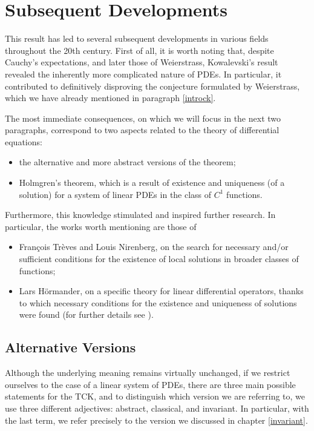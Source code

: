 \chapter{Subsequent Developments}

This result has led to several subsequent developments in various fields throughout the 20th century. First of all, it is worth noting that, despite Cauchy's expectations, and later those of Weierstrass, Kowalevski's result revealed the inherently more complicated nature of PDEs. In particular, it contributed to definitively disproving the conjecture formulated by Weierstrass, which we have already mentioned in paragraph \ref{introck}.

The most immediate consequences, on which we will focus in the next two paragraphs, correspond to two aspects related to the theory of differential equations:
\begin{itemize}
\item the alternative and more abstract versions of the theorem;
\item Holmgren's theorem, which is a result of existence and uniqueness (of a solution) for a system of linear PDEs in the class of $C^1$ functions.
\end{itemize}

Furthermore, this knowledge stimulated and inspired further research. In particular, the works worth mentioning are those of
\begin{itemize}
\item François Trèves and Louis Nirenberg, on the search for necessary and/or sufficient conditions for the existence of local solutions in broader classes of functions;
\item Lars Hörmander, on a specific theory for linear differential operators, thanks to which necessary conditions for the existence and uniqueness of solutions were found (for further details see \cite{Hormander}).
\end{itemize}

\newpage
\section{Alternative Versions}

Although the underlying meaning remains virtually unchanged, if we restrict ourselves to the case of a linear system of PDEs, there are three main possible statements for the TCK, and to distinguish which version we are referring to, we use three different adjectives: abstract, classical, and invariant. In particular, with the last term, we refer precisely to the version we discussed in chapter \ref{invariant}.

